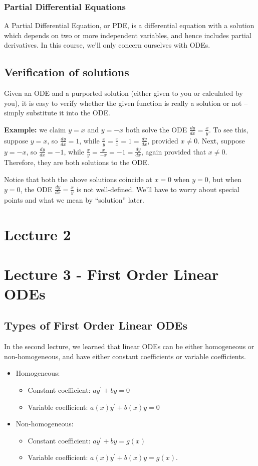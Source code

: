 \documentclass[11pt]{article}
\newcommand{\example}{\textbf{Example: }}
\newcommand{\fdx}{\frac{dy}{dx}} %
\newcommand{\yp}{y^{\prime}}
\begin{document}
\subsubsection{Partial Differential Equations}
	A Partial Differential Equation, or PDE, is a differential equation with a solution which depends on two or more independent
	variables, and hence includes partial derivatives. In this course, we'll only concern ourselves with ODEs.


\subsection{Verification of solutions}
	Given an ODE and a purported solution (either given to you or calculated by you), it is easy to verify whether the given 			function is really a solution or not -- simply substitute it into the ODE.

	\example we claim $y = x$ and $y = -x$ both solve the ODE $\fdx = \frac{x}{y}$.
	To see this, suppose $y=x$, so $\fdx = 1$, while $\frac{x}{y} = \frac{x}{x} = 1 = \fdx$, provided $x \neq 0$.
	Next, suppose $y=-x$, so $\fdx = -1$, while $\frac{x}{y} = \frac{x}{-x} = -1 = \fdx$, again provided that $x \neq 0$.
	Therefore, they are both solutions to the ODE.

	Notice that both the above solutions coincide at $x = 0$ when $y=0$,
	but when $y=0$, the ODE $\fdx = \frac{x}{y}$ is not well-defined.
	We'll have to worry about special points and what we mean by ``solution'' later.

\section{Lecture 2}
\section{Lecture 3 - First Order Linear ODEs}
\subsection{Types of First Order Linear ODEs}
	In the second lecture, we learned that linear ODEs can be either homogeneous or non-homogeneous, and have either constant coefficients or variable coefficients.
	\begin{itemize}
		\item Homogeneous:
			\begin{itemize}
				\item Constant coefficient: $a \yp + b y = 0$
				\item Variable coefficient: $a(x) \yp + b(x) y = 0$
			\end{itemize}
		\item Non-homogeneous:
			\begin{itemize}
				\item Constant coefficient: $a \yp + b y = g(x)$
				\item Variable coefficient: $a(x) \yp + b(x) y = g(x)$.
			\end{itemize}
	\end{itemize}
\end{document}
